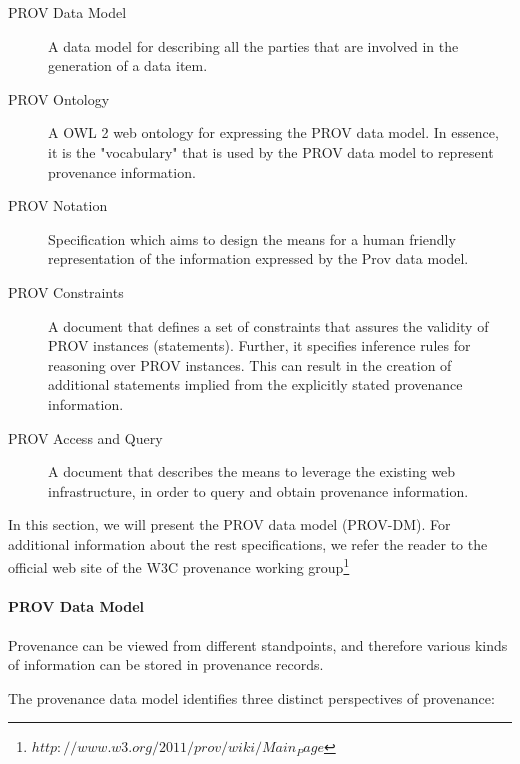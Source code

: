 \begin{description}
  \item[PROV Data Model]
        A data model for describing all the parties that are involved in the generation of a data item\cite{reference15}.
  \item[PROV Ontology]
        A OWL 2 web ontology for expressing the PROV data model. In essence, it is the "vocabulary" that is used by the PROV data model to represent provenance information\cite{prov-ontology}.
  \item[PROV Notation]
        Specification which aims to design the means for a human friendly representation of the information expressed by the Prov data model\cite{prov-notation}.
  \item[PROV Constraints]
         A document that defines a set of constraints that assures the validity of PROV instances (statements). Further, it specifies inference rules for reasoning over PROV instances. This can result in the creation of additional statements implied from the explicitly stated provenance information\cite{prov-constraints}.
  \item[PROV Access and Query]
        A document that describes the means to leverage the existing web infrastructure, in order to query and obtain provenance information\cite{prov-AQ}.
\end{description}

In this section, we will present the PROV data model (PROV-DM). For additional information about the rest specifications, we refer the reader to the official web site  of the W3C provenance working group\footnote{$http://www.w3.org/2011/prov/wiki/Main_Page$}


\paragraph{PROV Data Model}
Provenance can be viewed from different standpoints, and therefore various kinds of information can be stored in provenance records\cite{reference14}.

The provenance data model identifies three distinct perspectives of provenance:

